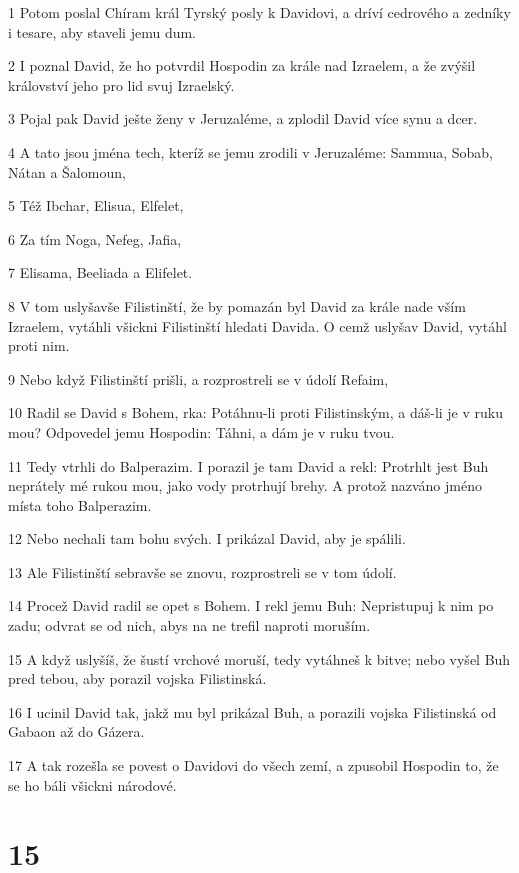 \par 1 Potom poslal Chíram král Tyrský posly k Davidovi, a dríví cedrového a zedníky i tesare, aby staveli jemu dum.
\par 2 I poznal David, že ho potvrdil Hospodin za krále nad Izraelem, a že zvýšil království jeho pro lid svuj Izraelský.
\par 3 Pojal pak David ješte ženy v Jeruzaléme, a zplodil David více synu a dcer.
\par 4 A tato jsou jména tech, kteríž se jemu zrodili v Jeruzaléme: Sammua, Sobab, Nátan a Šalomoun,
\par 5 Též Ibchar, Elisua, Elfelet,
\par 6 Za tím Noga, Nefeg, Jafia,
\par 7 Elisama, Beeliada a Elifelet.
\par 8 V tom uslyšavše Filistinští, že by pomazán byl David za krále nade vším Izraelem, vytáhli všickni Filistinští hledati Davida. O cemž uslyšav David, vytáhl proti nim.
\par 9 Nebo když Filistinští prišli, a rozprostreli se v údolí Refaim,
\par 10 Radil se David s Bohem, rka: Potáhnu-li proti Filistinským, a dáš-li je v ruku mou? Odpovedel jemu Hospodin: Táhni, a dám je v ruku tvou.
\par 11 Tedy vtrhli do Balperazim. I porazil je tam David a rekl: Protrhlt jest Buh neprátely mé rukou mou, jako vody protrhují brehy. A protož nazváno jméno místa toho Balperazim.
\par 12 Nebo nechali tam bohu svých. I prikázal David, aby je spálili.
\par 13 Ale Filistinští sebravše se znovu, rozprostreli se v tom údolí.
\par 14 Procež David radil se opet s Bohem. I rekl jemu Buh: Nepristupuj k nim po zadu; odvrat se od nich, abys na ne trefil naproti moruším.
\par 15 A když uslyšíš, že šustí vrchové moruší, tedy vytáhneš k bitve; nebo vyšel Buh pred tebou, aby porazil vojska Filistinská.
\par 16 I ucinil David tak, jakž mu byl prikázal Buh, a porazili vojska Filistinská od Gabaon až do Gázera.
\par 17 A tak rozešla se povest o Davidovi do všech zemí, a zpusobil Hospodin to, že se ho báli všickni národové.

\chapter{15}

